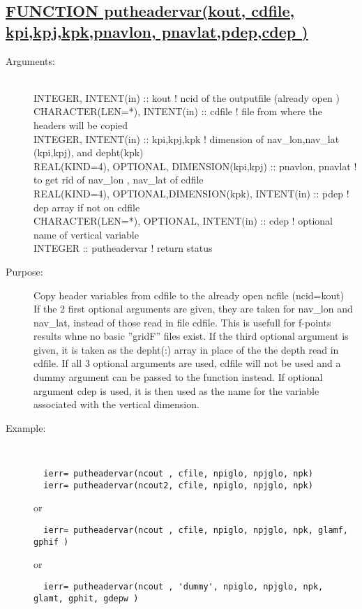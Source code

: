 \documentclass[a4paper,11pt]{article}
\begin{document}
\subsection*{\underline{FUNCTION putheadervar(kout, cdfile, kpi,kpj,kpk,pnavlon, pnavlat,pdep,cdep )  }}
\begin{description}
\item[Arguments:] \ \\
       INTEGER, INTENT(in) :: kout             ! ncid of the outputfile (already open ) \\
       CHARACTER(LEN=*), INTENT(in) :: cdfile  ! file from where the headers will be copied \\
       INTEGER, INTENT(in) :: kpi,kpj,kpk      ! dimension of nav\_lon,nav\_lat (kpi,kpj), and depht(kpk) \\
       REAL(KIND=4), OPTIONAL, DIMENSION(kpi,kpj) :: pnavlon, pnavlat  ! to get rid of nav\_lon , nav\_lat of cdfile \\
       REAL(KIND=4), OPTIONAL,DIMENSION(kpk), INTENT(in) :: pdep   ! dep array if not on cdfile \\
       CHARACTER(LEN=*), OPTIONAL, INTENT(in) :: cdep     ! optional name of vertical variable \\
       INTEGER :: putheadervar                 ! return status
\item[Purpose:] Copy header variables from cdfile to the already open ncfile (ncid=kout)\\
If the 2 first optional arguments are given, they are taken for nav\_lon and nav\_lat, instead of those read in file cdfile.
This is usefull for f-points results whne no basic ''gridF'' files exist. If the third optional argument is given, it is
taken as the depht(:) array in place of the the depth read in cdfile.  If all 3 optional arguments are used, cdfile will
not be used and a dummy argument can be passed to the function instead.  If optional argument cdep is used, it is then used as the name 
for the variable associated with the vertical dimension.
\item[Example:]\ \\
\begin{verbatim}
  ierr= putheadervar(ncout , cfile, npiglo, npjglo, npk)
  ierr= putheadervar(ncout2, cfile, npiglo, npjglo, npk)
\end{verbatim}
or 
\begin{verbatim}
  ierr= putheadervar(ncout , cfile, npiglo, npjglo, npk, glamf, gphif )
\end{verbatim}
or 
\begin{verbatim}
  ierr= putheadervar(ncout , 'dummy', npiglo, npjglo, npk, glamt, gphit, gdepw )
\end{verbatim}

\end{description}
\newpage
\end{document}
